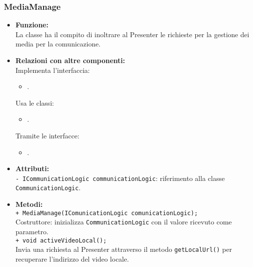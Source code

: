 {\begin{sloppypar}
{		%
		\subsubsection{MediaManage}\label{ssub:MediaManage}{
			\begin{itemize}
				\item[]  \textbf{Funzione:} \\
				La classe ha il compito di inoltrare al Presenter le richieste per la gestione dei media per la 
				comunicazione.
				
				\item[]  \textbf{Relazioni con altre componenti:} \\
				Implementa l'interfaccia:
				\begin{itemize}
					\item[] .
				\end{itemize}
				Usa le classi:
				\begin{itemize}
					\item[] .
				\end{itemize}					
				Tramite le interfacce:
				\begin{itemize}
					\item[] .
				\end{itemize}
				
				\item[]  \textbf{Attributi:}\\
				\texttt{- ICommunicationLogic communicationLogic}: riferimento alla classe \texttt{CommunicationLogic}.\\
				
				\item[]  \textbf{Metodi:}\\
				\texttt{+ MediaManage(IComunicationLogic comunicationLogic);}\\
				Costruttore: inizializza \texttt{CommunicationLogic} con il valore ricevuto come parametro.\\

				\texttt{+ void activeVideoLocal();}\\
				Invia una richiesta al Presenter attraverso il metodo \texttt{getLocalUrl()} per recuperare l'indirizzo del 
				video locale.\\
			\end{itemize}
			}

}
\end{sloppypar}}
